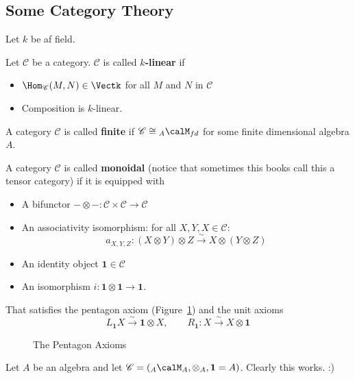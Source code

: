 \documentclass[12pt]{article}
\begin{document}
\subsection{Some Category Theory}
Let $k$ be af field.
\begin{defn}
	Let $\mathscr C$ be a category. $\mathscr C$ is called \textbf{$k$-linear} if
	\begin{itemize}
		\item $\Hom_{\mathscr C}(M,N)\in\Vectk$ for all $M$ and $N$ in $\mathscr C$
		\item Composition is $k$-linear.
	\end{itemize}
\end{defn}
\begin{defn}
	A category $\mathscr C$ is called \textbf{finite} if $\mathscr C\cong {_A\calM_{fd}}$ 
	for some finite dimensional algebra $A$.
\end{defn}
\begin{defn}
	A category $\mathscr C$ is called \textbf{monoidal} (notice that sometimes this books 
	call this a tensor category) if it is equipped with
	\begin{itemize}
		\item A bifunctor $-\otimes -:\mathscr C\times\mathscr C\to \mathscr C$
		\item An associativity isomorphism: for all $X,Y,X\in\mathscr C$:
		\[a_{X,Y,Z}:(X\otimes Y)\otimes Z\xrightarrow{\sim} X\otimes(Y\otimes Z)\]
		\item An identity object $\mathbf{1}\in\mathscr{C}$
		\item An isomorphism $i:\mathbf{1}\otimes\mathbf{1}\to \mathbf{1}.$
	\end{itemize}
	That satisfies the pentagon axiom (Figure~\ref{fig:pentagon}) and the unit axioms
	\[L_\mathbf{1}X\xrightarrow{\sim} \mathbf{1}\otimes X,\qquad R_\mathbf{1}:X\xrightarrow{\sim}X\otimes \mathbf{1}\]
\end{defn}
\begin{figure}\label{fig:pentagon}
	\centering
	\caption{The Pentagon Axioms}
\end{figure}
\begin{ex}
	Let $A$ be an algebra and let $\mathscr C= ({_A\calM_A},\otimes_A,\mathbf{1}=A)$.
	Clearly this works. :)
\end{ex}
\end{document}

